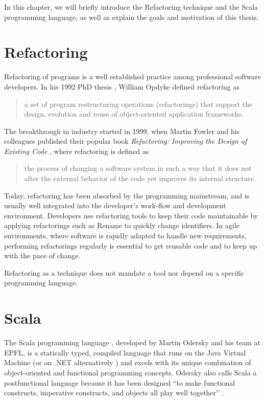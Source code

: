 \documentclass[10pt,a4paper,oneside]{scrreprt}
\begin{document}
In this chapter, we will briefly introduce the Refactoring technique and the Scala programming language, as well as explain the goals and motivation of this thesis.

\section{Refactoring}

Refactoring of programs is a well established practice among professional software developers. In his 1992 PhD thesis \cite{OpdykeThesis}, William Opdyke defined refactoring as 

\begin{quotation}
a set of program restructuring operations (refactorings) that support the design, evolution and reuse of object-oriented application frameworks.
\end{quotation}

The breakthrough in industry started in 1999, when Martin Fowler and his colleagues published their popular book \textit{Refactoring: Improving the Design of Existing Code} \cite{FowlerRefactoring}, where refactoring is defined as 

\begin{quotation}
the process of changing a software system in such a way that it does not alter the external behavior of the code yet improves its internal structure.
\end{quotation} 

Today, refactoring has been absorbed by the programming mainstream, and is usually well integrated into the developer's work-flow and development environment. Developers use refactoring tools to keep their code maintainable by applying refactorings such as Rename to quickly change identifiers. In agile environments, where software is rapidly adapted to handle new requirements, performing refactorings regularly is essential to get reusable code and to keep up with the pace of change.

Refactoring as a technique does not mandate a tool nor depend on a specific programming language.

\section{Scala}

The Scala programming language \cite{ProgrammingScala}, developed by Martin Odersky and his team at EPFL, is a statically typed, compiled language that runs on the Java Virtual Machine (or on .NET alternatively \cite{ScalacNet}) and excels with its unique combination of object-oriented and functional programming concepts. Odersky also calls Scala a postfunctional language because it has been designed ``to make functional constructs, imperative constructs, and objects all play well together'' \cite{ScalaPostFunctional}. 
\end{document}
